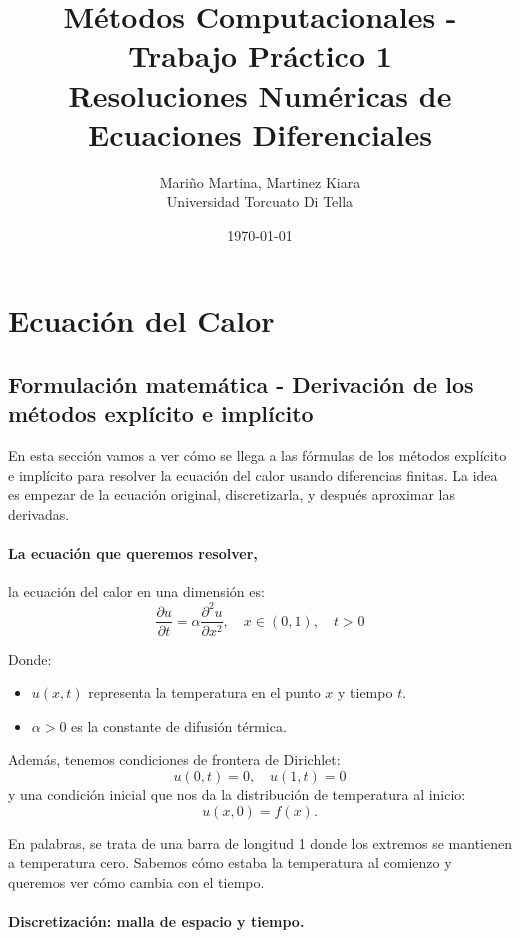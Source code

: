 \documentclass[12pt,a4paper]{article}
\title{\textbf{Métodos Computacionales - Trabajo Práctico 1}\\
Resoluciones Numéricas de Ecuaciones Diferenciales}
\author{
    Mariño Martina, Martinez Kiara\\ 
    Universidad Torcuato Di Tella
}
\date{\today}
\begin{document}
\maketitle
\thispagestyle{empty}
\newpage

\tableofcontents
\newpage


\section{Ecuación del Calor}
\subsection{Formulación matemática - Derivación de los métodos explícito e implícito}

En esta sección vamos a ver cómo se llega a las fórmulas de los métodos explícito e implícito para resolver la ecuación del calor usando diferencias finitas. La idea es empezar de la ecuación original, discretizarla, y después aproximar las derivadas.

\paragraph{La ecuación que queremos resolver,}

la ecuación del calor en una dimensión es:
\[
\frac{\partial u}{\partial t} = \alpha \frac{\partial^2 u}{\partial x^2},
\quad x \in (0,1), \quad t>0
\]

Donde:
\begin{itemize}
    \item $u(x,t)$ representa la temperatura en el punto $x$ y tiempo $t$.
    \item $\alpha > 0$ es la constante de difusión térmica.
\end{itemize}

Además, tenemos condiciones de frontera de Dirichlet:
\[
u(0,t) = 0, \quad u(1,t) = 0
\]
y una condición inicial que nos da la distribución de temperatura al inicio:
\[
u(x,0) = f(x).
\]

En palabras, se trata de una barra de longitud 1 donde los extremos se mantienen a temperatura cero. Sabemos cómo estaba la temperatura al comienzo y queremos ver cómo cambia con el tiempo.

\paragraph{Discretización: malla de espacio y tiempo.}
\end{document}
